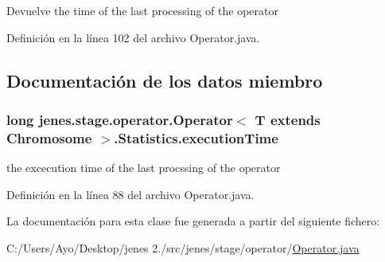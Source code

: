\begin{DoxyReturn}{Devuelve}
the time of the last processing of the operator 
\end{DoxyReturn}


Definición en la línea 102 del archivo Operator.\-java.



\subsection{Documentación de los datos miembro}
\hypertarget{classjenes_1_1stage_1_1operator_1_1_operator_3_01_t_01extends_01_chromosome_01_4_1_1_statistics_a3e7fc955df9ca708795c24336b12f937}{
\subsubsection[{execution\-Time}]{\setlength{\rightskip}{0pt plus 5cm}long jenes.\-stage.\-operator.\-Operator$<$ T extends Chromosome $>$.Statistics.\-execution\-Time\hspace{0.3cm}{\ttfamily [protected]}}}\label{classjenes_1_1stage_1_1operator_1_1_operator_3_01_t_01extends_01_chromosome_01_4_1_1_statistics_a3e7fc955df9ca708795c24336b12f937}
the excecution time of the last procssing of the operator 

Definición en la línea 88 del archivo Operator.\-java.



La documentación para esta clase fue generada a partir del siguiente fichero\-:\begin{DoxyCompactItemize}
\item 
C\-:/\-Users/\-Ayo/\-Desktop/jenes 2./src/jenes/stage/operator/\hyperlink{_operator_8java}{Operator.\-java}\end{DoxyCompactItemize}
